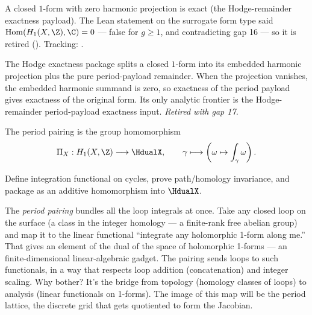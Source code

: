 \begin{lemma}
\label{lem:hodge-remainder-period-payload-exact}
A closed \(1\)-form with zero harmonic projection is exact (the Hodge-remainder
exactness payload). The Lean statement on the surrogate form type said
\(\mathrm{Hom}(H_1(X,\Z),\C)=0\) — false for \(g\ge 1\), and contradicting gap 16 — so it is
retired ().
Tracking: .
\end{lemma}

\begin{lemma}
\label{lem:hodge-zero-projection-exactness-assembly}
The Hodge exactness package splits a closed \(1\)-form into its embedded
harmonic projection plus the pure period-payload remainder. When the
projection vanishes, the embedded harmonic summand is zero, so exactness
of the period payload gives exactness of the original form. Its only
analytic frontier is the Hodge-remainder period-payload exactness input.
\textit{Retired with gap 17.}
\end{lemma}


\begin{definition}
\label{def:period-pairing}
The period pairing is the group homomorphism
\[
  \Pi_X : H_{1}(X,\Z) \longrightarrow \HdualX,\qquad
  \gamma \longmapsto \left(\omega \mapsto \int_{\gamma}\omega\right).
\]
\leanok

\proofplan
\leanok
Define integration functional on cycles, prove path/homology invariance, and
package as an additive homomorphism into \(\HdualX\).
\end{definition}

\begin{layman}
The \emph{period pairing} bundles all the loop integrals at once. Take
any closed loop on the surface (a class in the integer homology --- a
finite-rank free abelian group) and map it to the linear functional
``integrate any holomorphic 1-form along me.'' That gives an element
of the dual of the space of holomorphic 1-forms --- an finite-dimensional linear-algebraic gadget. The pairing sends loops to
such functionals, in a way that respects loop addition (concatenation)
and integer scaling. Why bother? It's the bridge from topology
(homology classes of loops) to analysis (linear functionals on
1-forms). The image of this map will be the period lattice, the
discrete grid that gets quotiented to form the Jacobian.
\end{layman}

